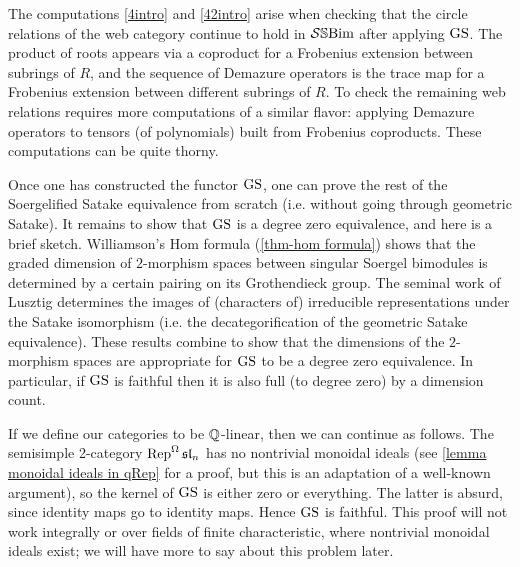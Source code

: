The computations \eqref{4intro} and \eqref{42intro} arise when checking that the circle relations of the web category continue to hold in $\mathcal{S}\mathbb{S}\text{Bim}$ after applying $\operatorname{GS}$. The product of roots appears via a coproduct for a Frobenius extension between subrings of $R$, and the sequence of Demazure operators is the trace map for a Frobenius extension between different subrings of $R$. To check the remaining web relations requires more computations of a similar flavor: applying Demazure operators to tensors (of polynomials) built from Frobenius coproducts. These computations can be quite thorny.

Once one has constructed the functor $\operatorname{GS}$, one can prove the rest of the Soergelified Satake equivalence from scratch (i.e. without going through geometric Satake). It remains to show that $\operatorname{GS}$ is a degree zero equivalence, and here is a brief sketch. Williamson's Hom formula (\cref{thm-hom formula}) shows that the graded dimension of $2$-morphism spaces between singular Soergel bimodules is determined by a certain pairing on its Grothendieck group. The seminal work of Lusztig \cite{LusztigGS} determines the images of (characters of) irreducible representations under the Satake isomorphism (i.e. the decategorification of the geometric Satake equivalence).  These results combine to show that the dimensions of the $2$-morphism spaces are appropriate for $\operatorname{GS}$ to be a degree zero equivalence. In particular, if $\operatorname{GS}$ is faithful then it is also full (to degree zero) by a dimension count.

If we define our categories to be $\mathbb{Q}$-linear, then we can continue as follows. The semisimple 2-category $\operatorname{Rep}^{\Omega} \mathfrak{sl}_n$ has no nontrivial monoidal ideals (see \cref{lemma monoidal ideals in qRep} for a proof, but this is an adaptation of a well-known argument), so the kernel of $\operatorname{GS}$ is either zero or everything. The latter is absurd, since identity maps go to identity maps. Hence $\operatorname{GS}$ is faithful. This proof will not work integrally or over fields of finite characteristic, where nontrivial monoidal ideals exist; we will have more to say about this problem later.


